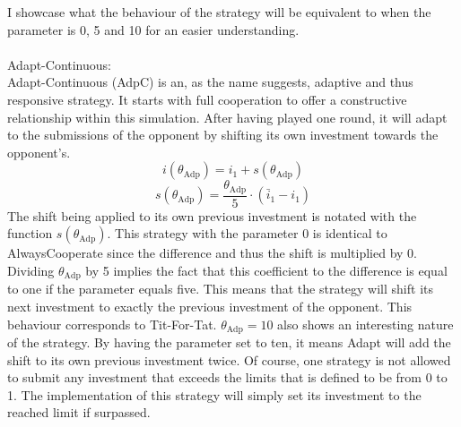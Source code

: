 \documentclass{article}
\begin{document}
\begin{itemize}
I showcase what the behaviour of the strategy will be equivalent to when the parameter is 0, 5 and 10 for an easier understanding.\\
		\\Adapt-Continuous:\\
Adapt-Continuous (AdpC) is an, as the name suggests, adaptive and thus responsive strategy.
It starts with full cooperation to offer a constructive relationship within this simulation.
After having played one round, it will adapt to the submissions of the opponent by shifting its own investment towards the opponent's.
$$i(\theta_{\mathrm{Adp}}) = i_1 + s(\theta_{\mathrm{Adp}})$$
$$s(\theta_{\mathrm{Adp}}) = \frac{\theta_{\mathrm{Adp}}}{5} \cdot (\bar i_1 - i_1)$$
The shift being applied to its own previous investment is notated with the function $s(\theta_{\mathrm{Adp}})$.
This strategy with the parameter 0 is identical to AlwaysCooperate since the difference and thus the shift is multiplied by 0.
Dividing $\theta_{\mathrm{Adp}}$ by 5 implies the fact that this coefficient to the difference is equal to one if the parameter equals five.
This means that the strategy will shift its next investment to exactly the previous investment of the opponent.
This behaviour corresponds to Tit-For-Tat.
$\theta_{\mathrm{Adp}} = 10$ also shows an interesting nature of the strategy.
By having the parameter set to ten, it means Adapt will add the shift to its own previous investment twice.
Of course, one strategy is not allowed to submit any investment that exceeds the limits that is defined to be from 0 to 1.
The implementation of this strategy will simply set its investment to the reached limit if surpassed.\\

\end{itemize}
\end{document}
